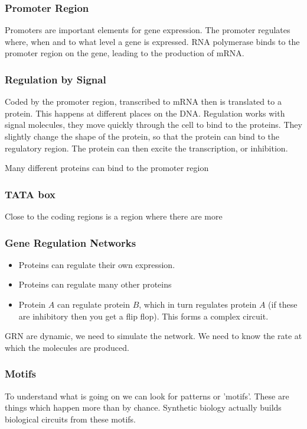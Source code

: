 \subsubsection{Promoter Region}
Promoters are important elements for gene expression. The promoter regulates where, when and to what level a gene is expressed. RNA polymerase binds to the promoter region on the gene, leading to the production of mRNA.

\subsubsection{Regulation by Signal}
Coded by the promoter region, transcribed to mRNA then is translated to a protein. This happens at different places on the DNA. Regulation works with signal molecules, they move quickly through the cell to bind to the proteins. They slightly change the shape of the protein, so that the protein can bind to the regulatory region. The protein can then excite the transcription, or inhibition.

Many different proteins can bind to the promoter region

\subsubsection{TATA box}
Close to the coding regions is a region where there are more 

\subsubsection{Gene Regulation Networks}
\begin{itemize}
    \itemsep0em
    \item Proteins can regulate their own expression. 
    \item Proteins can regulate many other proteins
    \item Protein $A$ can regulate protein $B$, which in turn regulates protein $A$ (if these are inhibitory then you get a flip flop). This forms a complex circuit.
\end{itemize}

GRN are dynamic, we need to simulate the network. We need to know the rate at which the molecules are produced.

\subsubsection{Motifs}
To understand what is going on we can look for patterns or 'motifs'. These are things which happen more than by chance. Synthetic biology actually builds biological circuits from these motifs.

